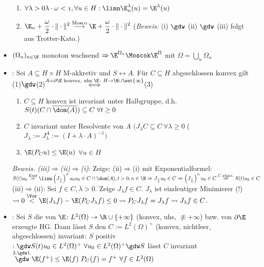 \begin{itemize}
\begin{enumerate}[label=(\roman*)]
		\item $\begin{aligned}
			\forall\lambda>0\mit\lambda\cdot\omega<1,\forall u\in H:
			\limn\E_n^\lambda(u)=\E^\lambda(u)
		\end{aligned}$
		\item $\begin{aligned}
			\E_n+\frac{\omega}{2}\cdot\Vert\cdot\Vert^2
			\overset{\text{Mosco}}{\longrightarrow}
			\E+\frac{\omega}{2}\cdot\Vert\cdot\Vert^2
		\end{aligned}$ (\textit{Beweis:} (i) $\gdw$ (ii) $\gdw$ (iii) folgt aus Trotter-Kato.)
		\end{enumerate}
		\item $(\Omega_n)_{n\in\N}$ monoton wachsend $\Rightarrow\E^{\Omega_n}\Moscok\E^\Omega$ mit $\Omega=\bigcup_n\Omega_n$
		\item {}: Sei $A\subseteq H\times H$ M-akkretiv und $S\leftrightarrow A$.
		Für $C\subseteq H$ abgeschlossen konvex gilt (1)$\gdw$(2)$\overset{A=\partial\E\text{ konvex, uhs }\E\colon H\to\R\cup\set{\infty}}{\Longleftrightarrow}$(3)
		\begin{enumerate}
			\item $C\subseteq H$ konvex ist invariant unter Halbgruppe, d.h. 
			$S(t)(C\cap\overline{\dom(A)})\subseteq C~\forall t\geq0$
			\item $C$ invariant unter Resolvente von $A$ $\big(J_\lambda C\subseteq C~\forall\lambda\geq0$ ($J_\lambda:=J_\lambda^A:=(I+\lambda\cdot A)^{-1}\big)
		$
			\item $\E(P_C u)\leq\E(u)$ $\forall u\in H$
		\end{enumerate}
		\textit{Beweis. (iii)$\Rightarrow$(ii)$\Rightarrow$(i)}:
		Zeige: (ii)$\Rightarrow$(i) mit Exponentialformel:\\
		$S(t)u_0\overset{\text{Expf}}{=}\limn\left(J_{\frac{t}{n}}\right)^n u_0
		u_0\in C\cap\dom(A),t>0,n\in\N
		\Rightarrow J_{\frac{t}{n}} u_0\in C
		\Rightarrow\left(J_{\frac{t}{n}}\right)^n u_0\in C
		\overset{C\text{ abges.}}\Rightarrow
		S(t) u_0\in C$\\
		(iii)$\Rightarrow$(ii):
		Sei $f\in C,\lambda>0$. Zeige $J_\lambda f\in C$. $J_\lambda$ ist eindeutiger Minimierer (!) $\leadsto 0\overset{\Vor}{<}\E(J_\lambda f)-\E(P_C J_\lambda f)\leq 0\leadsto P_C J_\lambda f=J_\lambda f\leadsto J_\lambda f\in C$.
		\item {}: Sei $S$ die von $\E\colon L^2(\Omega)\to\R\cup\lbrace+\infty\rbrace$ (konvex, uhs, $\not\equiv+\infty$) bzw. von $\partial\E$ erzeugte HG.
		Dann lässt $S$ den  $C:=L^2(\Omega)^+$ (konvex, nichtleer, abgeschlossen) invariant:
		$S$ positiv $:\gdw S(t)u_0\in L^2(\Omega)^+~\forall u_0\in L^2(\Omega)^+\gdw S$ lässt $C$ invariant $\overset{3.\gdw1.}{\gdw}\E(f^+)\leq\E(f)~P_C(f)=f^+~\forall f\in L^2(\Omega)$
	\end{itemize}
